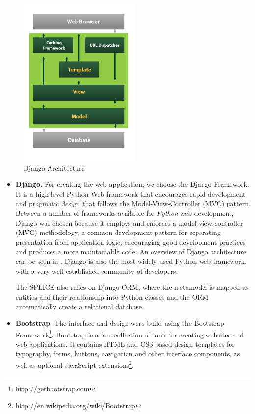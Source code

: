 \begin{figure}[htp]
\begin{center}
  \includegraphics[width=6cm]{chapters/proposed_solution/img/django-architecture.png}
  \caption[Django Architecture]{Django Architecture}
  \label{fg:django-architecture}
\end{center}
\end{figure}


\begin{itemize}
\item  \textbf{ Django.} For creating the web-application, we choose the Django Framework. It is a high-level Python Web framework that encourages rapid development and pragmatic design that follows the Model-View-Controller (MVC) pattern.
Between a number of frameworks available for \textit{Python} web-development, Django was chosen because it employs and enforces a model-view-controller (MVC) methodology, a common development pattern for separating presentation from application logic,  encouraging good development practices and produces a more maintainable code. An overview of Django architecture can be seen in . Django is also the most widely used Python web framework, with a very well established community of developers.

The \ac{SPLICE} also relies on Django \acf{ORM}, where the metamodel is mapped as entities and their relationship into Python classes and the \ac{ORM} automatically create a relational database.

\item  \textbf{ Bootstrap.} The interface and design were build using the Bootstrap Framework\footnote{http://getbootstrap.com}. Bootstrap is a free collection of tools for creating websites and web applications. It contains HTML and CSS-based design templates for typography, forms, buttons, navigation and other interface components, as well as optional JavaScript extensions\footnote{http://en.wikipedia.org/wiki/Bootstrap}.
\end{itemize}


